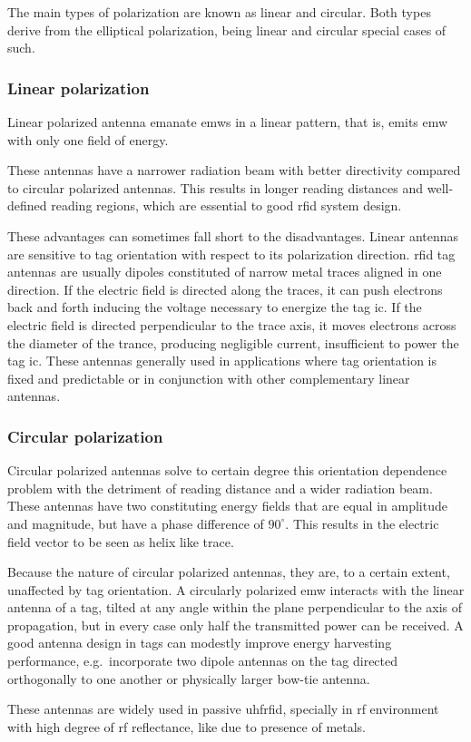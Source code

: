 The main types of polarization are known as linear and circular. Both types derive from the elliptical polarization, being linear and circular special cases of such.

\subsubsection{Linear polarization}

Linear polarized antenna emanate \acp{emw} in a linear pattern, that is, emits \ac{emw} with only one field of energy.

These antennas have a narrower radiation beam with better directivity compared to circular polarized antennas. This results in longer reading distances and well-defined reading regions, which are essential to good \ac{rfid} system design.

These advantages can sometimes fall short to the disadvantages. Linear antennas are sensitive to tag orientation with respect to its polarization direction. 
\ac{rfid} tag antennas are usually dipoles constituted of narrow metal traces aligned in one direction. If the electric field is directed along the traces, it can push electrons back and forth inducing the voltage necessary to energize the tag \ac{ic}. If the electric field is directed perpendicular to the trace axis, it moves electrons across the diameter of the trance, producing negligible current, insufficient to power the tag \ac{ic}.
These antennas generally used in applications where tag orientation is fixed and predictable or in conjunction with other complementary linear antennas.

\subsubsection{Circular polarization}

Circular polarized antennas solve to certain degree this orientation dependence problem with the detriment of reading distance and a wider radiation beam.
These antennas have two constituting energy fields that are equal in amplitude and magnitude, but have a phase difference of $90^\circ$. This results in the electric field vector to be seen as helix like trace. 

Because the nature of circular polarized antennas, they are, to a certain extent, unaffected by tag orientation.
A circularly polarized \ac{emw} interacts with the linear antenna of a tag, tilted at any angle within the plane perpendicular to the axis of propagation, but in every case only half the transmitted power can be received.
A good antenna design in tags can modestly improve energy harvesting performance, e.g.\ incorporate two dipole antennas on the tag directed orthogonally to one another or physically larger bow-tie antenna.

These antennas are widely used in passive \ac{uhfrfid}, specially in \ac{rf} environment with high degree of \ac{rf} reflectance, like due to presence of metals.

\cleardoublepage